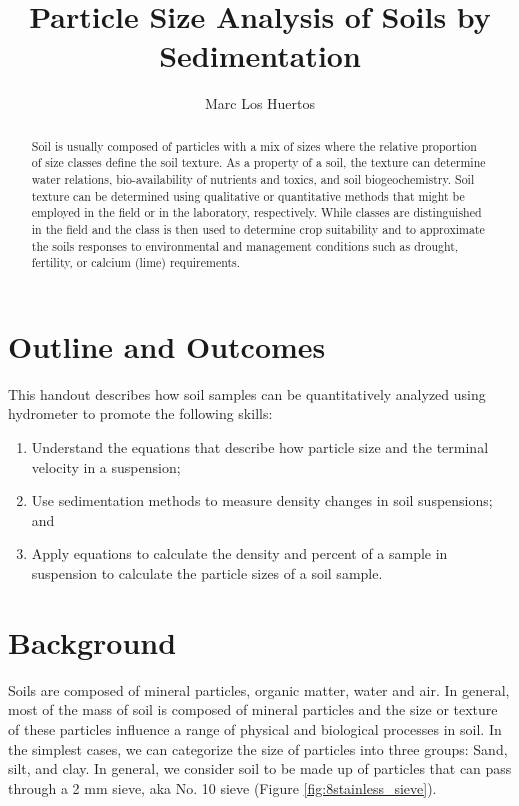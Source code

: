 \documentclass{tufte-handout}
\title{Particle Size Analysis of Soils by Sedimentation %
}
\author[Marc Los Huertos]{Marc Los Huertos}
\begin{document}


\maketitle%
\begin{abstract}
\noindent Soil is usually composed of particles with a mix of sizes where the relative proportion of size classes define the soil texture. As a property of a soil, the texture can determine water relations, bio-availability of nutrients and toxics, and soil biogeochemistry. Soil texture can be determined using qualitative or quantitative methods that might be employed in the field or in the laboratory, respectively. While classes are distinguished in the field and the class is then used to determine crop suitability and to approximate the soils responses to environmental and management conditions such as drought, fertility, or calcium (lime) requirements.
\end{abstract}



\section{Outline and Outcomes}
This handout describes how soil samples can be quantitatively analyzed using hydrometer to promote the following skills:

\begin{enumerate}
	\item Understand the equations that describe how particle size and the terminal velocity in a suspension;
	\item Use sedimentation methods to measure density changes in soil suspensions; and
	\item Apply equations to calculate the density and percent of a sample in suspension to calculate the particle sizes of a soil sample. 
\end{enumerate}

\section{Background}

Soils are composed of mineral particles, organic matter, water and air. In general, most of the mass of soil is composed of mineral particles and the size or texture of these particles influence a range of physical and biological processes in soil. In the simplest cases, we can categorize the size of particles into three groups: Sand, silt, and clay. In general, we consider soil to be made up of particles that can pass through a 2 mm sieve, aka No. 10 sieve (Figure \ref{fig:8stainless_sieve}). 
\end{document}
